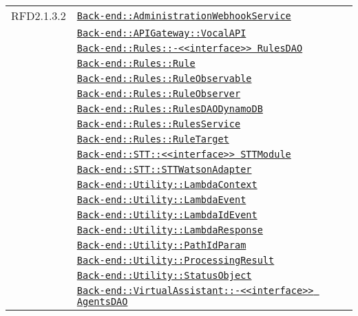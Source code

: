 \begin{longtable}{|>{\centering}m{3cm}|m{10cm}<{\centering}|}
RFD2.1.3.2 & \hyperref[Back-end::AdministrationWebhookService]{\texttt{Back-end::AdministrationWebhookService}}\\
& \hyperref[Back-end::APIGateway::VocalAPI]{\texttt{Back-end::APIGateway::VocalAPI}}\\
& \hyperref[Back-end::Rules::<<interface>> RulesDAO]{\texttt{Back-end::Rules::-\linebreak <<interface>> RulesDAO}}\\
& \hyperref[Back-end::Rules::Rule]{\texttt{Back-end::Rules::Rule}}\\
& \hyperref[Back-end::Rules::RuleObservable]{\texttt{Back-end::Rules::RuleObservable}}\\
& \hyperref[Back-end::Rules::RuleObserver]{\texttt{Back-end::Rules::RuleObserver}}\\
& \hyperref[Back-end::Rules::RulesDAODynamoDB]{\texttt{Back-end::Rules::RulesDAODynamoDB}}\\
& \hyperref[Back-end::Rules::RulesService]{\texttt{Back-end::Rules::RulesService}}\\
& \hyperref[Back-end::Rules::RuleTarget]{\texttt{Back-end::Rules::RuleTarget}}\\
& \hyperref[Back-end::STT::<<interface>> STTModule]{\texttt{Back-end::STT::<<interface>> STTModule}}\\
& \hyperref[Back-end::STT::STTWatsonAdapter]{\texttt{Back-end::STT::STTWatsonAdapter}}\\
& \hyperref[Back-end::Utility::LambdaContext]{\texttt{Back-end::Utility::LambdaContext}}\\
& \hyperref[Back-end::Utility::LambdaEvent]{\texttt{Back-end::Utility::LambdaEvent}}\\
& \hyperref[Back-end::Utility::LambdaIdEvent]{\texttt{Back-end::Utility::LambdaIdEvent}}\\
& \hyperref[Back-end::Utility::LambdaResponse]{\texttt{Back-end::Utility::LambdaResponse}}\\
& \hyperref[Back-end::Utility::PathIdParam]{\texttt{Back-end::Utility::PathIdParam}}\\
& \hyperref[Back-end::Utility::ProcessingResult]{\texttt{Back-end::Utility::ProcessingResult}}\\
& \hyperref[Back-end::Utility::StatusObject]{\texttt{Back-end::Utility::StatusObject}}\\
& \hyperref[Back-end::VirtualAssistant::<<interface>> AgentsDAO]{\texttt{Back-end::VirtualAssistant::-\linebreak <<interface>> AgentsDAO}}\\

\end{longtable}
